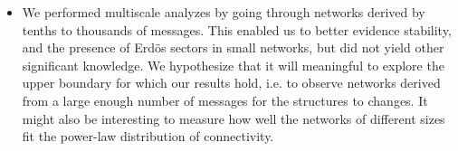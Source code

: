 \begin{itemize}
\item We performed multiscale analyzes by going through networks derived by tenths to thousands of messages.
	This enabled us to better evidence stability, and the presence of Erd\"os sectors in small networks, 
		but did not yield other significant knowledge.
		We hypothesize that it will meaningful to explore the upper boundary for which our results hold,
		i.e. to observe networks derived from a large enough number of messages for the structures to changes.
		It might also be interesting to measure how well the networks of different sizes fit the power-law distribution
		of connectivity.
\end{itemize}







